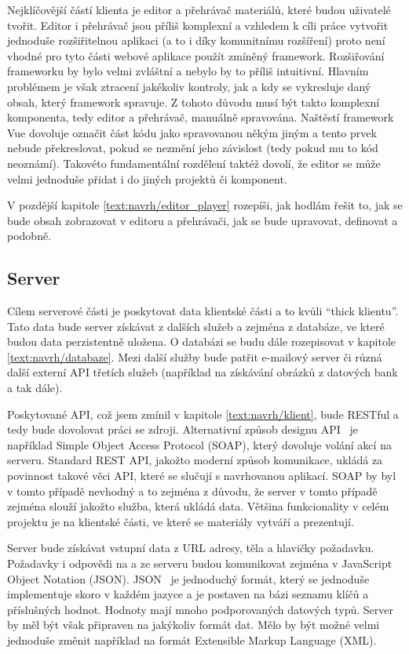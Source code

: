 Nejklíčovější částí klienta je editor a přehrávač materiálů, které budou uživatelé tvořit.
Editor i přehrávač jsou příliš komplexní a vzhledem k cíli práce vytvořit jednoduše rozšiřitelnou aplikaci (a to i díky komunitnímu rozšíření) proto není vhodné pro tyto části webové aplikace použít zmíněný framework.
Rozšiřování frameworku by bylo velmi zvláštní a nebylo by to příliš intuitivní.
Hlavním problémem je však ztracení jakékoliv kontroly, jak a kdy se vykresluje daný obsah, který framework spravuje.
Z tohoto důvodu musí být takto komplexní komponenta, tedy editor a přehrávač, manuálně spravována.
Naštěstí framework Vue dovoluje označit část kódu jako spravovanou někým jiným a tento prvek nebude překreslovat, pokud se nezmění jeho závislost (tedy pokud mu to kód neoznámí). 
Takovéto fundamentální rozdělení taktéž dovolí, že editor se může velmi jednoduše přidat i do jiných projektů či komponent.

V pozdější kapitole \ref{text:navrh/editor_player} rozepíši, jak hodlám řešit to, jak se bude obsah zobrazovat v editoru a přehrávači, jak se bude upravovat, definovat a podobně.

\subsection{Server}\label{text:navrh/server}

Cílem serverové části je poskytovat data klientské části a to kvůli \enquote{thick klientu}. 
Tato data bude server získávat z dalších služeb a zejména z databáze, ve které budou data perzistentně uložena.
O databázi se budu dále rozepisovat v kapitole \ref{text:navrh/databaze}.
Mezi další služby bude patřit e-mailový server či různá další externí API třetích služeb (například na získávání obrázků z datových bank a tak dále).

Poskytované API, což jsem zmínil v kapitole \ref{text:navrh/klient}, bude RESTful a tedy bude dovolovat práci se zdroji. 
Alternativní způsob designu API~\cite{richardson_2013} je například Simple Object Access Protocol (SOAP), který dovoluje volání akcí na serveru.
Standard REST API, jakožto moderní způsob komunikace, ukládá za povinnost takové věci API, které se slučují s navrhovanou aplikací.
SOAP by byl v tomto případě nevhodný a to zejména z důvodu, že server v tomto případě zejména slouží jakožto služba, která ukládá data.
Většina funkcionality v celém projektu je na klientské části, ve které se materiály vytváří a prezentují.

Server bude získávat vstupní data z URL adresy, těla a hlavičky požadavku.
Požadavky i odpovědi na a ze serveru budou komunikovat zejména v JavaScript Object Notation (JSON).
JSON~\cite{richardson_2013, uzayr2022frontend} je jednoduchý formát, který se jednoduše implementuje skoro v každém jazyce a je postaven na bázi seznamu klíčů a příslušných hodnot.
Hodnoty mají mnoho podporovaných datových typů.
Server by měl být však připraven na jakýkoliv formát dat.
Mělo by být možné velmi jednoduše změnit například na formát Extensible Markup Language (XML).

